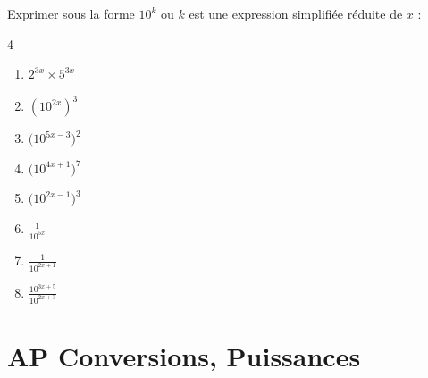 \documentclass[main.tex]{subfiles}
\begin{document}
\begin{exercise}	Exprimer sous la forme $10^{k}$ ou $k$ est une expression simplifiée réduite de $x$ :  
	\begin{multicols}{4} 
		\begin{enumerate}[label={$\Alph*=$}]   
			\item\rule[-0.6em]{0em}{2.2em} $2^{3x}\times 5^{3x} $  
			\item\rule[-0.6em]{0em}{2.2em} $\left(10^{2x}\right)^{3}$ 
			\item\rule[-0.6em]{0em}{2.2em} $\big(10^{5x-3}\big)^{2}$
			\item\rule[-0.6em]{0em}{2.2em} $\big(10^{4x+1}\big)^7$ 
			\item\rule[-0.6em]{0em}{2.2em} $\big(10^{2x-1}\big)^3$ 
			\item\rule[-0.6em]{0em}{2.2em} $\frac{1}{10^{5x}}$
			\item\rule[-0.6em]{0em}{2.2em} $\frac{1}{10^{2x+1}}$
			\item\rule[-0.6em]{0em}{2.2em} $\frac{10^{3x+5}}{10^{2x+3}}$
		\end{enumerate}
	\end{multicols}
\end{exercise} 


\newpage 
{}  
\pagestyle{scrheadings} %
\onehalfspacing 
 \section{AP Conversions, Puissances}
  
\end{document}
